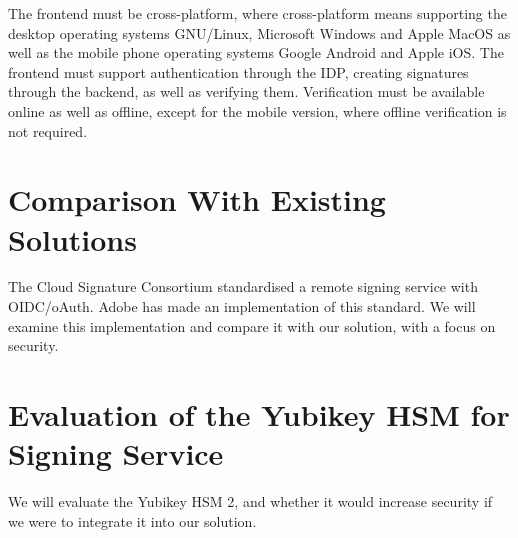 The frontend must be cross-platform, where cross-platform means supporting the desktop operating systems
GNU/Linux, Microsoft Windows and Apple MacOS as well as the mobile phone operating systems Google Android and Apple iOS.
The frontend must support authentication through the \gls{IDP}, creating signatures through the backend, as well as verifying them.
Verification must be available online as well as offline, except for the mobile version, where offline verification is not required.

\section{Comparison With Existing Solutions}
\label{section:comparison}

The Cloud Signature Consortium standardised a remote signing service with OIDC/oAuth.
Adobe has made an implementation of this standard.
We will examine this implementation and compare it with our solution, with a focus on security.

\section{Evaluation of the Yubikey HSM for Signing Service}
\label{section:evaluateyubikey}

We will evaluate the Yubikey \gls{HSM} 2, and whether it would increase security if we were to integrate it into our solution.


